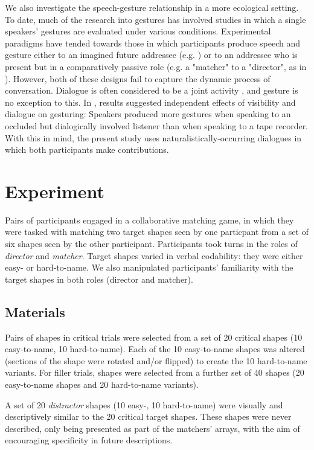 \documentclass[a4paper,man,natbib]{apa6}
\newcommand*{\term}[1]{\emph{#1}} %
\begin{document}
We also investigate the speech-gesture relationship in a more ecological setting. 
To date, much of the research into gestures has involved studies in which a single speakers' gestures are evaluated under various conditions.
Experimental paradigms have tended towards those in which participants produce speech and gesture either to an imagined future addressee (e.g. \citet{Morsella2004, Wesp2001}) or to an addressee who is present but in a comparatively passive role (e.g. a "matcher" to a "director", as in \citet{DeRuiter2012, Bangerter2004, Holler2007, Hoetjes2015}).
However, both of these designs fail to capture the dynamic process of conversation. 
Dialogue is often considered to be a joint activity \citep{Clark1996}, and gesture is no exception to this.
In \citet{Bavelas2008}, results suggested independent effects of visibility and dialogue on gesturing: Speakers produced more gestures when speaking to an occluded but dialogically involved listener than when speaking to a tape recorder. 
With this in mind, the present study uses naturalistically-occurring dialogues in which both participants make contributions. 


\section{Experiment}

Pairs of participants engaged in a collaborative matching game, in which they were tasked with matching two target shapes seen by one particpant from a set of six shapes seen by the other participant. 
Participants took turns in the roles of \term{director} and \term{matcher}.
Target shapes varied in verbal codability: they were either easy- or hard-to-name.
We also manipulated participants' familiarity with the target shapes in both roles (director and matcher).


\subsection{Materials}
Pairs of shapes in critical trials were selected from a set of 20 critical shapes (10 easy-to-name, 10 hard-to-name).
Each of the 10 easy-to-name shapes was altered (sections of the shape were rotated and/or flipped) to create the 10 hard-to-name variants. %
For filler trials, shapes were selected from a further set of 40 shapes (20 easy-to-name shapes and 20 hard-to-name variants). 

A set of 20 \term{distractor} shapes (10 easy-, 10 hard-to-name) were visually and descriptively similar to the 20 critical target shapes. %
These shapes were never described, only being presented as part of the matchers' arrays, with the aim of encouraging specificity in future descriptions.
\end{document}
